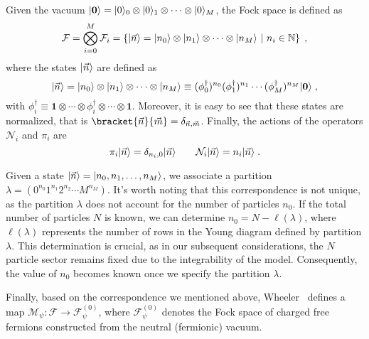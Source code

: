 \documentclass[a4paper,11pt]{amsart}
\begin{document}
Given the vacuum \(\lvert\bm{0}\rangle = \lvert0\rangle_0\otimes \lvert0\rangle_1
\otimes \cdots \otimes  \lvert0\rangle_M\), the Fock space is defined as 
\begin{equation}
  \mathcal{F} = \bigotimes_{i=0}^M \mathcal{F}_i = 
  \left\{\lvert\vec{n}\rangle = \lvert n_0\rangle\otimes \lvert n_1\rangle \otimes \cdots
  \otimes \lvert n_M\rangle \ | \ n_i \in \mathbb{N} \right\}\; ,
\end{equation}
where the states \(\lvert\vec{n}\rangle\) are defined as 
\begin{equation}
  \lvert\vec{n}\rangle = \lvert n_0\rangle\otimes \lvert n_1\rangle \otimes \cdots \otimes \lvert n_M\rangle 
 \equiv  (\phi_0^\dagger)^{n_0} (\phi_1^\dagger)^{n_1} \cdots  (\phi_M^\dagger)^{n_M} \lvert\bm{0}\rangle \; ,
\end{equation}
with \(\phi_i^\dagger \equiv \bm{1} \otimes \cdots \otimes
\phi_i^\dagger \otimes \cdots \otimes \bm{1}\).  Moreover, it is easy
to see that these states are normalized, that is
\(\bracket{\vec{n}}{\vec{m}}=\delta_{\vec{n}, \vec{m}}\).  Finally,
the actions of the operators \(\mathcal{N}_i\) and \(\pi_i\) are
\begin{equation}
    \pi_i\lvert\vec{n}\rangle  = \delta_{n_i, 0} \lvert\vec{n}\rangle \qquad 
    \mathcal{N}_i\lvert\vec{n}\rangle = n_i \lvert\vec{n}\rangle\; .
\end{equation}
 
Given a state \(\lvert\vec{n}\rangle = \lvert n_0, n_1, \dots, n_M\rangle\), we
associate a partition \( \lambda = (0^{n_0} 1^{n_1} 2^{n_2} \cdots
M^{n_M})\).  It's worth noting that this correspondence is not unique,
as the partition \(\lambda\) does not account for the number of
particles \(n_0\).  If the total number of particles \(N\) is known,
we can determine \(n_0 = N - \ell(\lambda)\), where \(\ell(\lambda)\)
represents the number of rows in the Young diagram defined by
partition \(\lambda\). This determination is crucial, as in our
subsequent considerations, the \(N\) particle sector remains fixed due
to the integrability of the model. Consequently, the value of \(n_0\)
becomes known once we specify the partition \(\lambda\).

Finally, based on the correspondence we mentioned above,
Wheeler~\cite{Wheeler:2010vmq} defines a map \(\mathcal{M}_\psi:
\mathcal{F} \to \mathcal{F}^{(0)}_\psi\), where
\(\mathcal{F}^{(0)}_\psi\) denotes the Fock space of charged free
fermions constructed from the neutral (fermionic) vacuum.

\end{document}
